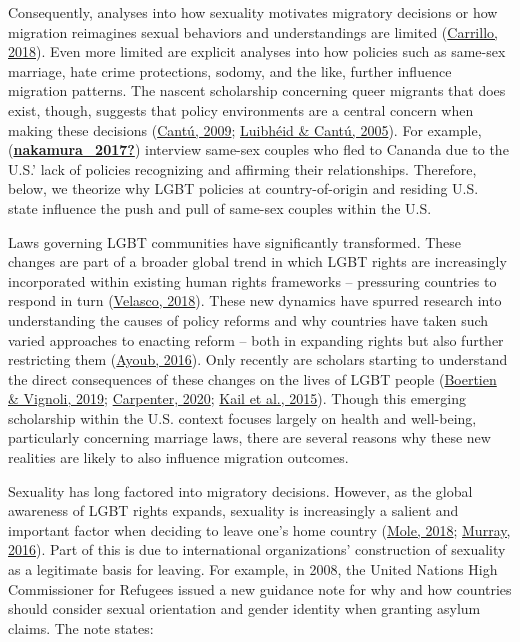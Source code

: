 \documentclass[
  11pt,
]{article}
\begin{document}
Consequently, analyses into how sexuality motivates migratory decisions or how migration reimagines sexual behaviors and understandings are limited (\protect\hyperlink{ref-carrillo_2018}{Carrillo, 2018}). Even more limited are explicit analyses into how policies such as same-sex marriage, hate crime protections, sodomy, and the like, further influence migration patterns. The nascent scholarship concerning queer migrants that does exist, though, suggests that policy environments are a central concern when making these decisions (\protect\hyperlink{ref-cantu_2009}{Cantú, 2009}; \protect\hyperlink{ref-luibheid_2005}{Luibhéid \& Cantú, 2005}). For example, (\protect\hyperlink{ref-nakamura_2017}{\textbf{nakamura\_2017?}}) interview same-sex couples who fled to Cananda due to the U.S.' lack of policies recognizing and affirming their relationships. Therefore, below, we theorize why LGBT policies at country-of-origin and residing U.S. state influence the push and pull of same-sex couples within the U.S.

Laws governing LGBT communities have significantly transformed. These changes are part of a broader global trend in which LGBT rights are increasingly incorporated within existing human rights frameworks -- pressuring countries to respond in turn (\protect\hyperlink{ref-velasco_2018}{Velasco, 2018}). These new dynamics have spurred research into understanding the causes of policy reforms and why countries have taken such varied approaches to enacting reform -- both in expanding rights but also further restricting them (\protect\hyperlink{ref-ayoub_2016}{Ayoub, 2016}). Only recently are scholars starting to understand the direct consequences of these changes on the lives of LGBT people (\protect\hyperlink{ref-boertien_2019}{Boertien \& Vignoli, 2019}; \protect\hyperlink{ref-carpenter_2020}{Carpenter, 2020}; \protect\hyperlink{ref-kail_2015}{Kail et al., 2015}). Though this emerging scholarship within the U.S. context focuses largely on health and well-being, particularly concerning marriage laws, there are several reasons why these new realities are likely to also influence migration outcomes.

Sexuality has long factored into migratory decisions. However, as the global awareness of LGBT rights expands, sexuality is increasingly a salient and important factor when deciding to leave one's home country (\protect\hyperlink{ref-mole_2018a}{Mole, 2018}; \protect\hyperlink{ref-murray_2016}{Murray, 2016}). Part of this is due to international organizations' construction of sexuality as a legitimate basis for leaving. For example, in 2008, the United Nations High Commissioner for Refugees issued a new guidance note for why and how countries should consider sexual orientation and gender identity when granting asylum claims. The note states:
\end{document}
